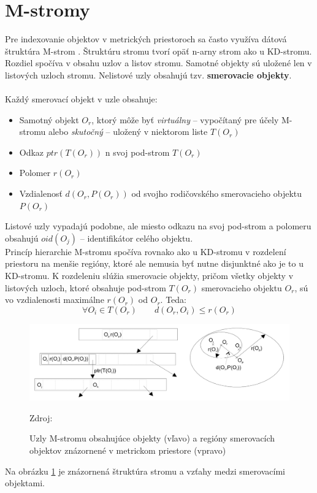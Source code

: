 \documentclass[12pt,a4paper,oneside]{fithesis2}
\begin{document}
  
\section{M-stromy}
   Pre indexovanie objektov v metrických priestoroch sa často využíva dátová štruktúra M-strom \cite{stromy}. Štruktúru stromu tvorí opäť n-arny strom ako u KD-stromu. Rozdiel spočíva v obsahu uzlov a listov stromu. Samotné objekty sú uložené len v listových uzloch stromu. Nelistové uzly obsahujú tzv. \textbf{smerovacie objekty}. \\\\
Každý smerovací objekt v uzle obsahuje:
\begin{itemize}
\item Samotný objekt $O_r$, ktorý môže byť \textit{virtuálny} -- vypočítaný pre účely M-stromu alebo \textit{skutočný} -- uložený v niektorom liste $T(O_r)$
\item Odkaz $ptr(T(O_r))$ n svoj pod-strom $T(O_r)$
\item Polomer $r(O_r)$
\item Vzdialenosť $d(O_r,P(O_r))$  od svojho rodičovského smerovacieho objektu $P(O_r)$
\end{itemize}
Listové uzly vypadajú podobne, ale miesto odkazu na svoj pod-strom a polomeru obsahujú $oid(O_j)$ -- identifikátor celého objektu.\\

Princíp hierarchie M-stromu spočíva rovnako ako u KD-stromu v rozdelení priestoru na menšie regióny, ktoré ale nemusia byť nutne disjunktné ako je to u KD-stromu. K rozdeleniu slúžia smerovacie objekty, pričom všetky objekty v listových uzloch, ktoré obsahuje pod-strom $T(O_r)$ smerovacieho objektu $O_r$, sú vo vzdialenosti maximálne $r(O_r)$ od $O_r$. Teda:
\begin{equation*}
\forall O_i \in T(O_r) \qquad   d(O_r,O_i) \leq r(O_r)
\end{equation*}
\begin{figure}
  		\centering
  		\includegraphics[width=\textwidth]{obr/m-tree.png}
  		\caption{Uzly M-stromu obsahujúce objekty (vľavo) a regióny smerovacích objektov znázornené v metrickom priestore (vpravo)} Zdroj: \cite{stromy} 
  		\label{m-strom}
\end{figure}
Na obrázku \ref{m-strom} je znázornená štruktúra stromu a vzťahy medzi smerovacími objektami.\\
\end{document}
